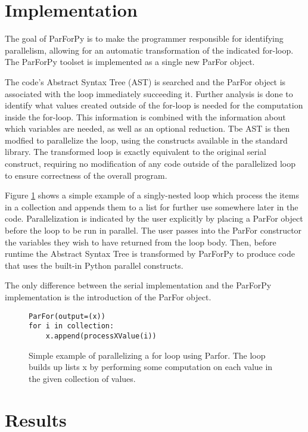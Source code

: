 \documentclass[conference]{IEEEtran}
\begin{document}
\section{Implementation}

The goal of ParForPy is to make the programmer responsible for identifying parallelism, 
allowing for an automatic transformation of the indicated for-loop. 
The ParForPy toolset is implemented as a single new ParFor object. 

The code's Abstract Syntax Tree (AST) is searched and the ParFor object
is associated with the loop immediately succeeding it.
Further analysis is done to identify what values created outside 
of the for-loop is needed for the computation inside the for-loop.
This information is combined with the information about which variables
are needed, as well as an optional reduction.
Tbe AST is then modfied to parallelize the loop, using the constructs available in the standard library. 
The transformed loop is exactly equivalent to the original serial construct, requiring no modification of any code outside of the 
parallelized loop to ensure correctness of the overall program.

Figure \ref{basicExample} shows a simple example of a singly-nested loop
which process the items in a collection and appends them to a list for 
further use somewhere later in the code.
Parallelization is indicated by the user explicitly by placing a ParFor 
object before the loop to be run in parallel.
The user passes into the ParFor constructor the variables they wish to have returned from the loop body.
Then, before runtime the Abstract Syntax Tree is transformed by ParForPy
to produce code that uses the built-in Python parallel constructs.


The only difference between the serial implementation and the ParForPy implementation is the introduction of the ParFor object.

\begin{figure}[t]
\begin{lstlisting}[frame=single]
ParFor(output=(x))
for i in collection:
    x.append(processXValue(i))
\end{lstlisting}
\caption{Simple example of parallelizing a for loop using Parfor. The loop builds up lists x by performing some computation on each value in the given collection of values.}
\label{basicExample}
\end{figure}

\section{Results}
\end{document}
